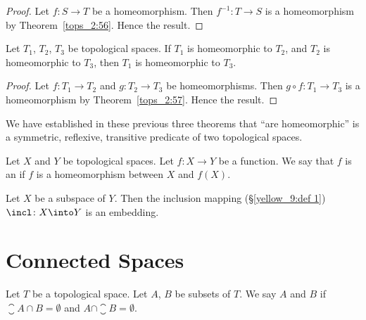\begin{proof}
Let $f\colon S\to T$ be a homeomorphism. Then $f^{-1}\colon T\to S$ is
a homeomorphism by Theorem~\ref{tops_2:56}. Hence the result.
\end{proof}

\begin{theorem}
Let $T_{1}$, $T_{2}$, $T_{3}$ be topological spaces.
If $T_{1}$ is homeomorphic to $T_{2}$, and $T_{2}$ is homeomorphic to $T_{3}$,
then $T_{1}$ is homeomorphic to $T_{3}$.
\end{theorem}

\begin{proof}
Let $f\colon T_{1}\to T_{2}$ and $g\colon T_{2}\to T_{3}$ be homeomorphisms.
Then $g\circ f\colon T_{1}\to T_{3}$ is a homeomorphism by
Theorem~\ref{tops_2:57}. Hence the result.
\end{proof}

\begin{remark}
We have established in these previous three theorems that ``are
homeomorphic'' is a symmetric, reflexive, transitive predicate of two
topological spaces.
\end{remark}

\begin{definition}
Let $X$ and $Y$ be topological spaces.
Let $f\colon X\to Y$ be a function.
We say that $f$ is an  if $f$ is a homeomorphism
between $X$ and $f(X)$.
\end{definition}

\begin{theorem}
Let $X$ be a subspace of $Y$.
Then the inclusion mapping (\S\ref{yellow_9:def 1}) $\incl\colon X\into Y$ is an embedding.
\end{theorem}

\section{Connected Spaces}

\begin{definition}
Let $T$ be a topological space. Let $A$, $B$ be subsets of $T$.
We say $A$ and $B$  if $\closure{A}\cap B=\emptyset$
and $A\cap\closure{B}=\emptyset$.
\end{definition}

